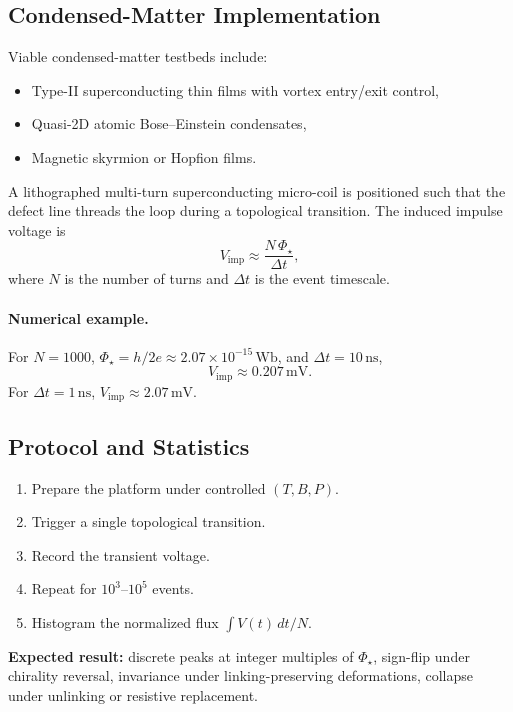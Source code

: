 \documentclass[reprint,aps,onecolumn,nofootinbib]{revtex4-2}
\begin{document}
    \subsection{Condensed-Matter Implementation}
    Viable condensed-matter testbeds include:
    \begin{itemize}
        \item Type-II superconducting thin films with vortex entry/exit control,
        \item Quasi-2D atomic Bose–Einstein condensates,
        \item Magnetic skyrmion or Hopfion films.
    \end{itemize}
    A lithographed multi-turn superconducting micro-coil is positioned such that the defect line threads the
    loop during a topological transition. The induced impulse voltage is
    \begin{equation}
    V_{\text{imp}} \approx \frac{N \,\Phi_\star}{\Delta t},
    \end{equation}
    where $N$ is the number of turns and $\Delta t$ is the event timescale.

    \paragraph*{Numerical example.}
    For $N=1000$, $\Phi_\star = h/2e \approx 2.07\times10^{-15}\,\mathrm{Wb}$, and $\Delta t=10\,\mathrm{ns}$,
    \[
    V_{\mathrm{imp}} \approx 0.207\,\mathrm{mV}.
    \]
    For $\Delta t=1\,\mathrm{ns}$, $V_{\mathrm{imp}} \approx 2.07\,\mathrm{mV}$.

    \subsection{Protocol and Statistics}
    \begin{enumerate}
        \item Prepare the platform under controlled $(T,B,P)$.
        \item Trigger a single topological transition.
        \item Record the transient voltage.
        \item Repeat for $10^3$–$10^5$ events.
        \item Histogram the normalized flux $\int V(t)\,dt / N$.
    \end{enumerate}
    \textbf{Expected result:} discrete peaks at integer multiples of $\Phi_\star$, sign-flip under chirality
    reversal, invariance under linking-preserving deformations, collapse under unlinking or resistive replacement.
\end{document}
